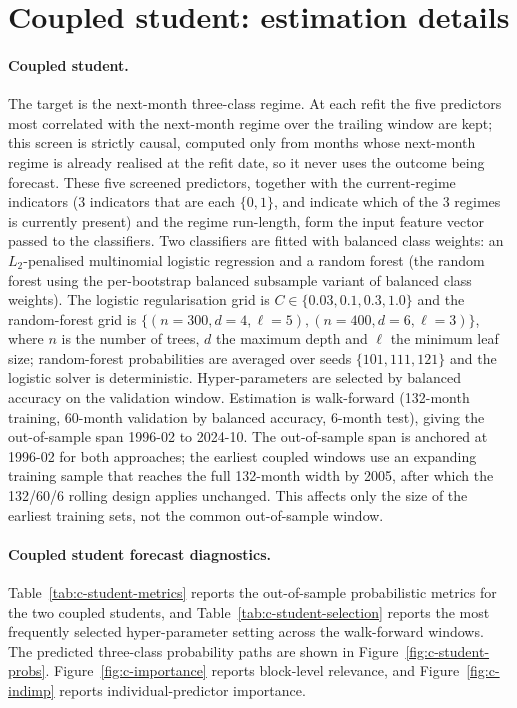 \FloatBarrier

\section{Coupled student: estimation details}
\label{app:student-coupled}

\paragraph{Coupled student.} The target is the next-month three-class regime. At each refit
the five predictors most correlated with the next-month regime over the trailing window are
kept; this screen is strictly causal, computed only from months whose next-month regime is
already realised at the refit date, so it never uses the outcome being forecast. These five
screened predictors, together with the current-regime indicators (3 indicators that are each $\{0, 1\}$, and indicate which of the 3 regimes is currently present) and the regime run-length,
form the input feature vector passed to the classifiers. Two classifiers are
fitted with balanced class weights: an $L_2$-penalised multinomial logistic regression and a
random forest (the random forest using the per-bootstrap balanced subsample variant of balanced class weights). The logistic regularisation grid is $C\in\{0.03,0.1,0.3,1.0\}$ and the
random-forest grid is $\{(n{=}300,d{=}4,\ell{=}5),(n{=}400,d{=}6,\ell{=}3)\}$, where $n$ is
the number of trees, $d$ the maximum depth and $\ell$ the minimum leaf size; random-forest
probabilities are averaged over seeds $\{101,111,121\}$ and the logistic solver is
deterministic. Hyper-parameters are selected by balanced accuracy on the validation window.
Estimation is walk-forward (132-month training, 60-month validation by
balanced accuracy, 6-month test), giving the out-of-sample span 1996-02 to 2024-10. The
out-of-sample span is anchored at 1996-02 for both approaches; the earliest coupled windows use
an expanding training sample that reaches the full 132-month width by 2005, after which the
132/60/6 rolling design applies unchanged. This affects only the size of the earliest training
sets, not the common out-of-sample window.

\paragraph{Coupled student forecast diagnostics.}
Table~\ref{tab:c-student-metrics} reports the out-of-sample probabilistic metrics for the two
coupled students, and Table~\ref{tab:c-student-selection} reports the most frequently selected
hyper-parameter setting across the walk-forward windows. The predicted three-class
probability paths are shown in Figure~\ref{fig:c-student-probs}. Figure~\ref{fig:c-importance}
reports block-level relevance, and Figure~\ref{fig:c-indimp} reports individual-predictor
importance.

